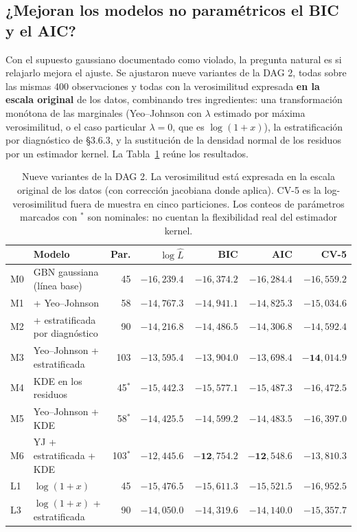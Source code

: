 \documentclass[11pt, a4paper]{article}
\begin{document}
\subsection{¿Mejoran los modelos no paramétricos el BIC y el AIC?}
\label{sec:noparam}

Con el supuesto gaussiano documentado como violado, la pregunta natural es si relajarlo mejora el
ajuste. Se ajustaron nueve variantes de la DAG 2, todas sobre las mismas 400 observaciones y todas
con la verosimilitud expresada \textbf{en la escala original} de los datos, combinando tres
ingredientes: una transformación monótona de las marginales (Yeo--Johnson con $\lambda$ estimado
por máxima verosimilitud, o el caso particular $\lambda = 0$, que es $\log(1+x)$), la
estratificación por diagnóstico de \S3.6.3, y la sustitución de la densidad normal de los residuos
por un estimador kernel. La Tabla~\ref{tab:noparam} reúne los resultados.

\begin{table}[htbp]
\centering
\caption{Nueve variantes de la DAG 2. La verosimilitud está expresada en la escala original de los
datos (con corrección jacobiana donde aplica). CV-5 es la log-verosimilitud fuera de muestra en
cinco particiones. Los conteos de parámetros marcados con $^{*}$ son nominales: no cuentan la
flexibilidad real del estimador kernel.}
\label{tab:noparam}
\small
\setlength{\tabcolsep}{5pt}
\renewcommand{\arraystretch}{1.15}
\begin{tabular}{l l r r r r r}
\toprule
& \textbf{Modelo} & \textbf{Par.} & \textbf{$\log \hat{L}$} & \textbf{BIC} & \textbf{AIC} &
\textbf{CV-5} \\
\midrule
M0 & GBN gaussiana (línea base)          & 45  & $-16{,}239.4$ & $-16{,}374.2$ & $-16{,}284.4$ & $-16{,}559.2$ \\
M1 & \; + Yeo--Johnson                    & 58  & $-14{,}767.3$ & $-14{,}941.1$ & $-14{,}825.3$ & $-15{,}034.6$ \\
M2 & \; + estratificada por diagnóstico   & 90  & $-14{,}216.8$ & $-14{,}486.5$ & $-14{,}306.8$ & $-14{,}592.4$ \\
M3 & \; Yeo--Johnson + estratificada      & 103 & $-13{,}595.4$ & $-13{,}904.0$ & $-13{,}698.4$ & $\mathbf{-14{,}014.9}$ \\
\midrule
M4 & KDE en los residuos                  & 45$^{*}$  & $-15{,}442.3$ & $-15{,}577.1$ & $-15{,}487.3$ & $-16{,}472.5$ \\
M5 & \; Yeo--Johnson + KDE                & 58$^{*}$  & $-14{,}425.5$ & $-14{,}599.2$ & $-14{,}483.5$ & $-16{,}397.0$ \\
M6 & \; YJ + estratificada + KDE          & 103$^{*}$ & $-12{,}445.6$ & $\mathbf{-12{,}754.2}$ & $\mathbf{-12{,}548.6}$ & $-13{,}810.3$ \\
\midrule
L1 & $\log(1+x)$                          & 45  & $-15{,}476.5$ & $-15{,}611.3$ & $-15{,}521.5$ & $-16{,}952.5$ \\
L3 & $\log(1+x)$ + estratificada          & 90  & $-14{,}050.0$ & $-14{,}319.6$ & $-14{,}140.0$ & $-15{,}357.7$ \\
\bottomrule
\end{tabular}
\end{table}
\end{document}
